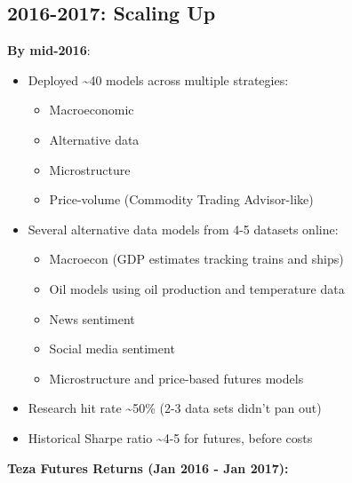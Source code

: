 \documentclass[11pt, letterpaper]{article}
\begin{document}
  \subsection{2016-2017: Scaling Up}
  \label{scaling-up}

  \textbf{By mid-2016}:

  \begin{itemize}
    \item Deployed \textasciitilde40 models across multiple strategies:

      \begin{itemize}
        \item Macroeconomic

        \item Alternative data

        \item Microstructure

        \item Price-volume (Commodity Trading Advisor-like)
      \end{itemize}

    \item Several alternative data models from 4-5 datasets online:

      \begin{itemize}
        \item Macroecon (GDP estimates tracking trains and ships)

        \item Oil models using oil production and temperature data

        \item News sentiment

        \item Social media sentiment

        \item Microstructure and price-based futures models
      \end{itemize}

    \item Research hit rate \textasciitilde50\% (2-3 data sets didn't
      pan out)

    \item Historical Sharpe ratio \textasciitilde4-5 for futures, before
      costs
  \end{itemize}

  \textbf{Teza Futures Returns (Jan 2016 - Jan 2017):}
\end{document}
